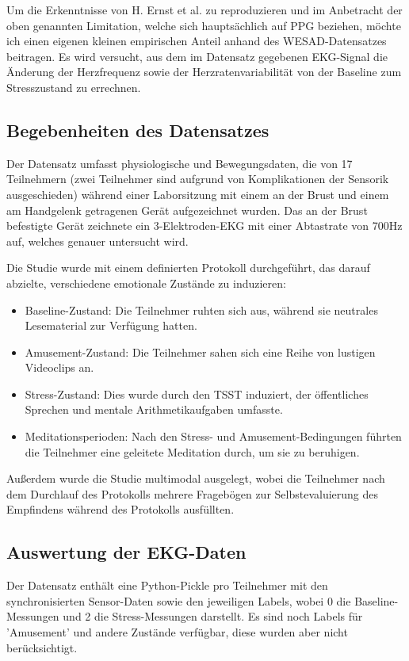 Um die Erkenntnisse von H. Ernst et al. zu reproduzieren und im Anbetracht der oben genannten Limitation, welche sich hauptsächlich auf \ac{PPG} beziehen, möchte ich einen eigenen kleinen empirischen Anteil anhand des WESAD-Datensatzes \cite{Schmidt2018WESAD} beitragen. Es wird versucht, aus dem im Datensatz gegebenen \ac{EKG}-Signal die Änderung der Herzfrequenz sowie der Herzratenvariabilität von der Baseline zum Stresszustand zu errechnen.

\subsection{Begebenheiten des Datensatzes}
Der Datensatz umfasst physiologische und Bewegungsdaten, die von 17 Teilnehmern (zwei Teilnehmer sind aufgrund von Komplikationen der Sensorik ausgeschieden) während einer Laborsitzung mit einem an der Brust und einem am Handgelenk getragenen Gerät aufgezeichnet wurden. Das an der Brust befestigte Gerät zeichnete ein 3-Elektroden-\ac{EKG} mit einer Abtastrate von 700Hz auf, welches genauer untersucht wird.

Die Studie wurde mit einem definierten Protokoll durchgeführt, das darauf abzielte, verschiedene emotionale Zustände zu induzieren:

\begin{itemize}
    \item Baseline-Zustand: Die Teilnehmer ruhten sich aus, während sie neutrales Lesematerial zur Verfügung hatten.
    \item Amusement-Zustand: Die Teilnehmer sahen sich eine Reihe von lustigen Videoclips an.
    \item Stress-Zustand: Dies wurde durch den \ac{TSST} induziert, der öffentliches Sprechen und mentale Arithmetikaufgaben umfasste.
    \item Meditationsperioden: Nach den Stress- und Amusement-Bedingungen führten die Teilnehmer eine geleitete Meditation durch, um sie zu beruhigen.
\end{itemize}

Außerdem wurde die Studie multimodal ausgelegt, wobei die Teilnehmer nach dem Durchlauf des Protokolls mehrere Fragebögen zur Selbstevaluierung des Empfindens während des Protokolls ausfüllten.

\subsection{Auswertung der EKG-Daten}

Der Datensatz enthält eine Python-Pickle pro Teilnehmer mit den synchronisierten Sensor-Daten sowie den jeweiligen Labels, wobei 0 die Baseline-Messungen und 2 die Stress-Messungen darstellt. Es sind noch Labels für 'Amusement' und andere Zustände verfügbar, diese wurden aber nicht berücksichtigt.

